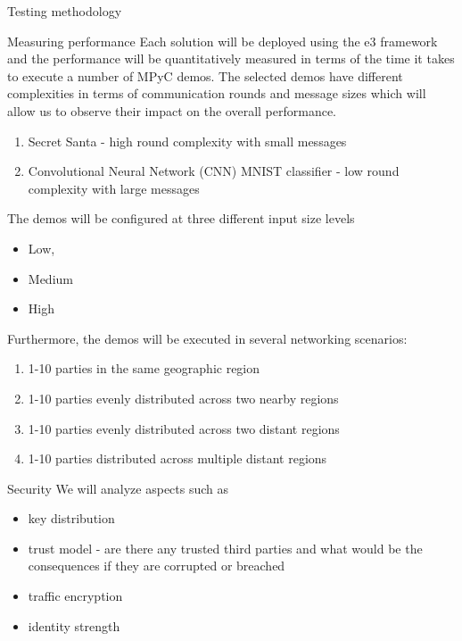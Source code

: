 \begin{frame}{Testing methodology}
\begin{block}{Measuring performance}
Each solution will be deployed using the \gls{e3} framework and the
performance will be quantitatively measured in terms of the time it
takes to execute a number of MPyC demos. The selected demos have
different complexities in terms of communication rounds and message
sizes which will allow us to observe their impact on the overall
performance.

\begin{enumerate}
\tightlist
\item
  Secret Santa - high round complexity with small messages
\item
  Convolutional Neural Network (CNN) MNIST classifier - low round
  complexity with large messages
\end{enumerate}

The demos will be configured at three different input size levels

\begin{itemize}
\tightlist
\item
  Low,
\item
  Medium
\item
  High
\end{itemize}

Furthermore, the demos will be executed in several networking scenarios:

\begin{enumerate}
\tightlist
\item
  1-10 parties in the same geographic region
\item
  1-10 parties evenly distributed across two nearby regions
\item
  1-10 parties evenly distributed across two distant regions
\item
  1-10 parties distributed across multiple distant regions
\end{enumerate}
\end{block}

\begin{block}{Security}
\protect\hypertarget{security}{}
We will analyze aspects such as

\begin{itemize}
\tightlist
\item
  key distribution
\item
  trust model - are there any trusted third parties and what would be
  the consequences if they are corrupted or breached
\item
  traffic encryption
\item
  identity strength
\end{itemize}
\end{block}


\end{frame}
